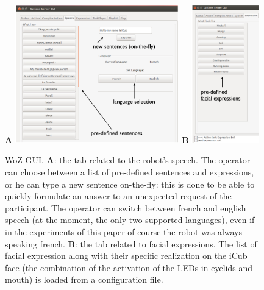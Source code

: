 \begin{figure}
\centering
{\large \textbf{\textsf{A}}} \includegraphics[height=6cm]{Serena/figures/gui_speech.jpg} \hspace{0.5cm}
{\large \textbf{\textsf{B}}}  \includegraphics[height=6cm]{Serena/figures/gui_faceexpressions.jpg}
\caption{WoZ GUI. \textbf{\textsf{A}}: the tab related to the robot's speech. The operator can choose between a list of pre-defined sentences and expressions, or he can type a new sentence on-the-fly: this is done to be able to quickly formulate an answer to an unexpected request of the participant. The operator can switch between french and english speech (at the moment, the only two supported languages), even if in the experiments of this paper of course the robot was always speaking french. \textbf{\textsf{B}}: the tab related to facial expressions. The list of facial expression along with their specific realization on the iCub face (the combination of the activation of the LEDs in eyelids and mouth) is loaded from a configuration file.}
\label{fig:guispeech}
\end{figure}


